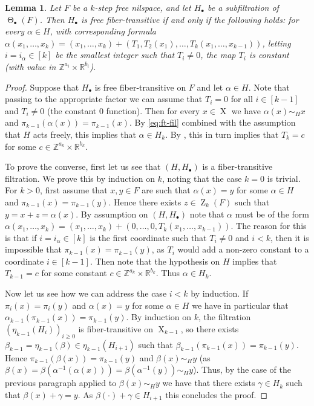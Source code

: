 \documentclass[a4paper,12pt,reqno]{amsart}
\newtheorem{lemma}[theorem]{Lemma}
\theoremstyle{definition}
\newcommand{\mb}{\mathbb}
\DeclareMathOperator{\ab}{Z}
\DeclareMathOperator{\tran}{\Theta}
\DeclareMathOperator{\ns}{X}
\begin{document}
\begin{lemma}\label{lem:equi-strong-good}
Let $F$ be a $k$-step free nilspace, and let $H_\bullet$ be a subfiltration of $\tran_\bullet(F)$. Then $H_\bullet$ is free fiber-transitive if and only if the following holds: for every $\alpha\in H$, with corresponding formula $\alpha(x_1,\ldots,x_k)=(x_1,\ldots,x_k)+(T_1,T_2(x_1),\ldots,T_k(x_1,\ldots,x_{k-1}))$, letting $i=i_\alpha\in[k]$ be the smallest integer such that $T_i\not=0$, the map $T_i$ is  constant (with value in $\mb{Z}^{a_i}\times \mb{R}^{b_i}$).
\end{lemma}

\begin{proof}
Suppose that $H_\bullet$ is free fiber-transitive on $F$ and let $\alpha\in H$. Note that passing to the appropriate factor we can assume that $T_i=0$ for all $i\in[k-1]$ and $T_i\not=0$ (the constant 0 function). Then for every $x\in \ns$ we have $\alpha(x)\sim_H x$ and $\pi_{k-1}(\alpha(x))=\pi_{k-1}(x)$. By  \eqref{eq:ft-fil} combined with the assumption that $H$ acts freely, this implies that $\alpha\in H_k$. By \cite[Lemma 3.2.37]{Cand:Notes1}, this in turn  implies that $T_k=c$ for some $c\in \mb{Z}^{a_{k}}\times \mb{R}^{b_{k}}$.

To prove the converse, first let us see that $(H,H_\bullet)$ is a fiber-transitive filtration. We prove this by induction on $k$,  noting that the case $k=0$ is trivial. For $k>0$, first assume that $x,y\in F$ are such that $\alpha(x)=y$ for some $\alpha\in H$ and $\pi_{k-1}(x)=\pi_{k-1}(y)$. Hence there exists $z\in \ab_k(F)$ such that $y=x+z=\alpha(x)$. By assumption on $(H,H_\bullet)$ note that $\alpha$ must be of the form $\alpha(x_1,\ldots,x_k)=(x_1,\ldots,x_k)+(0,\ldots,0,T_k(x_1,\ldots,x_{k-1}))$. The reason for this is that if $i=i_\alpha\in[k]$ is the first coordinate such that $T_i\not=0$ and $i<k$, then it is impossible that $\pi_{k-1}(x)=\pi_{k-1}(y)$, as $T_i$ would add a non-zero constant to a coordinate $i\in[k-1]$. Then note that the hypothesis on $H$ implies that $T_{k-1}=c$ for some constant $c\in \mb{Z}^{a_{k}}\times \mb{R}^{b_{k}}$. Thus $\alpha\in H_k$.

Now let us see how we can address the case $i<k$ by induction. If $\pi_i(x)=\pi_i(y)$ and $\alpha(x)=y$ for some $\alpha\in H$ we have in particular that $\alpha_{k-1}(\pi_{k-1}(x))=\pi_{k-1}(y)$. By induction on $k$, the filtration $(\eta_{k-1}(H_i))_{i\geq 0}$ is fiber-transitive on $\ns_{k-1}$, so there exists $\beta_{k-1}=\eta_{k-1}(\beta)\in \eta_{k-1}(H_{i+1})$ such that $\beta_{k-1}(\pi_{k-1}(x))=\pi_{k-1}(y)$. Hence $\pi_{k-1}(\beta(x)) = \pi_{k-1}(y)$ and $\beta(x)\sim_H y$ (as $\beta(x)=\beta(\alpha^{-1}(\alpha(x))) = \beta(\alpha^{-1}(y))\sim_H y$). Thus, by the case of the previous paragraph applied to $\beta(x)\sim_H y$ we have that there exists $\gamma\in H_k$ such that $\beta(x)+\gamma=y$. As $\beta(\cdot)+\gamma\in H_{i+1}$ this concludes the proof.


\end{proof}
\end{document}

